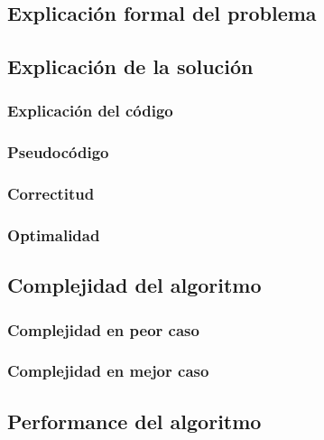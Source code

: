 \subsection{Explicación formal del problema}

\subsection{Explicación de la solución}

\subsubsection{Explicación del código}

\subsubsection{Pseudocódigo}

\subsubsection{Correctitud}

\subsubsection{Optimalidad}

\subsection{Complejidad del algoritmo}

\subsubsection{Complejidad en peor caso}

\subsubsection{Complejidad en mejor caso}

\subsection{Performance del algoritmo}


